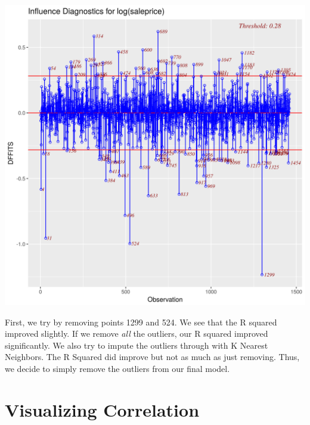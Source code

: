 \documentclass[12pt]{article}
\begin{document}
\begin{flushleft}
\begin{flushleft}
\begin{flushleft}
\end{flushleft}

\centering
    \vspace*{0.5 cm}
    \includegraphics[scale = .5]{outlier.png}\\[1.0 cm]	

\begin{flushleft}

First, we try by removing points 1299 and 524. We see that the R squared improved slightly. If we remove \textit{all} the outliers, our R squared improved significantly. We also try to impute the outliers through with K Nearest Neighbors. The R Squared did improve but not as much as just removing. Thus, we decide to simply remove the outliers from our final model.

\end{flushleft}

\section{Visualizing Correlation}


\end{flushleft}
\end{flushleft}
\end{document}
